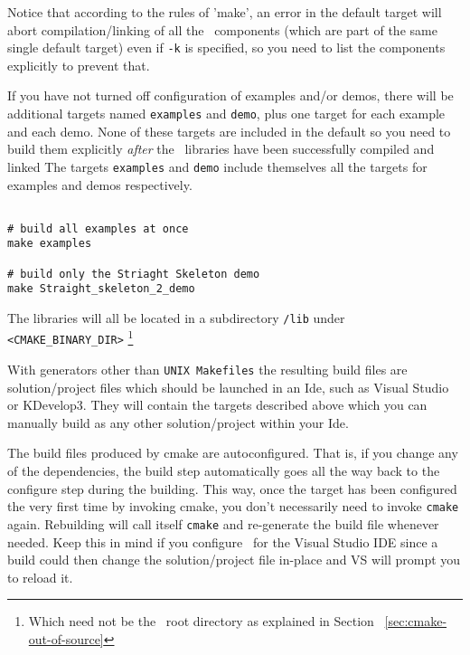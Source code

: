 Notice that according to the rules of 'make', an error in the default target will abort compilation/linking of
all the \cgal\ components (which are part of the same single default target) even if {\tt -k} 
is specified, so you need to list the components explicitly to prevent that.

If you have not turned off configuration of examples and/or demos, there will be additional
targets named \texttt{examples} and \texttt{demo}, plus one target for each example and each demo.
None of these targets are included in the default so you need to build them explicitly
{\em after} the \cgal\ libraries have been successfully compiled and linked
The targets \texttt{examples} and \texttt{demo} include themselves all the targets
for examples and demos respectively.

{\ccTexHtml{\scriptsize}{}
\begin{verbatim}

# build all examples at once
make examples 

# build only the Striaght Skeleton demo
make Straight_skeleton_2_demo

\end{verbatim}
}

The libraries will all be located in a subdirectory {\tt /lib} under {\tt <CMAKE\_BINARY\_DIR>}
\footnote{Which need not be the \cgal\ root directory as explained in Section ~\ref{sec:cmake-out-of-source}}

With generators other than {\tt UNIX Makefiles} the resulting build files are solution/project files which
should be launched in an {\sc Ide}, such as Visual Studio or KDevelop3. They will contain the targets described
above which you can manually build as any other solution/project within your {\sc Ide}.

\begin{ccAdvanced}
The build files produced by cmake are autoconfigured. That is, if you change any 
of the dependencies, the build step automatically goes all the way back to the configure step
during the building. This way, once the target has been configured the very first time by
invoking cmake, you don't necessarily need to invoke \texttt{cmake} again. Rebuilding will call
itself \texttt{cmake} and re-generate the build file whenever needed. Keep this in mind if you
configure \cgal\ for the Visual Studio IDE since a build could then change the solution/project 
file in-place and VS will prompt you to reload it.
\end{ccAdvanced}


